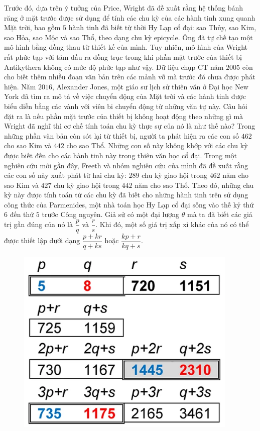 \begin{multicols}{2}
	\vskip 0.1cm
	Trước đó, dựa trên ý tưởng của Price, Wright đã đề xuất rằng hệ thống bánh răng ở mặt trước được sử dụng để tính các chu kỳ của các hành tinh xung quanh Mặt trời, bao gồm $5$ hành tinh đã biết từ thời Hy Lạp cổ đại: sao Thủy, sao Kim, sao Hỏa, sao Mộc và sao Thổ, theo dạng chu kỳ epicycle. Ông đã tự chế tạo một mô hình bằng đồng thau từ thiết kế của mình. Tuy nhiên, mô hình của Wright rất phức tạp với tám đầu ra đồng trục trong khi phần mặt trước của thiết bị Antikythera không có mức độ phức tạp như vậy. Dữ liệu chụp CT năm $2005$ còn cho biết thêm nhiều đoạn văn bản trên các mảnh vỡ mà trước đó chưa được phát hiện. Năm $2016$, Alexander Jones, một giáo sư lịch sử thiên văn ở Đại học New York đã tìm ra mô tả về việc chuyển động của Mặt trời và các hành tinh được biểu diễn bằng các vành với viên bi chuyển động từ những văn tự này. Câu hỏi đặt ra là nếu phần mặt trước của thiết bị không hoạt động theo những gì mà Wright đã nghĩ thì cơ chế tính toán chu kỳ thực sự của nó là như thế nào?
	\vskip 0.1cm
	Trong những phần văn bản còn sót lại từ thiết bị, người ta phát hiện ra các con số $462$ cho sao Kim và $442$ cho sao Thổ. Những con số này không khớp với các chu kỳ được biết đến cho các hành tinh này trong thiên văn học cổ đại. Trong một nghiên cứu mới gần đây, Freeth và nhóm nghiên cứu của mình đã đề xuất rằng các con số này xuất phát từ hai chu kỳ: $289$ chu kỳ giao hội trong $462$ năm cho sao Kim và $427$ chu kỳ giao hội trong $442$ năm cho sao Thổ. Theo đó, những chu kỳ này được tính toán từ các chu kỳ đã biết cho những hành tinh trên sử dụng công thức của Parmenides, một nhà toán học Hy Lạp cổ đại sống vào thế kỷ thứ 6 đến thứ $5$ trước Công nguyên. Giả sử có một đại lượng $\theta$ mà ta đã biết các giá trị gần đúng của nó là $\dfrac{p}{q}$ và $\dfrac{r}{s}$. Khi đó, một số giá trị xấp xỉ khác của nó có thể được thiết lập dưới dạng $\dfrac{p+kr}{q + ks}$ hoặc $\dfrac{kp + r}{kq + s}$.
	\begin{figure}[H]
		\vspace*{-5pt}
		\centering
		\captionsetup{labelformat= empty, justification=centering}
		\includegraphics[width= 1\linewidth]{7}

\end{figure}
\end{multicols}
